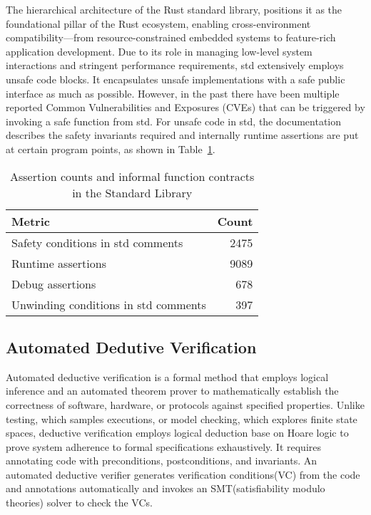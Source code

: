 \documentclass[conference]{IEEEtran}
\begin{document}
The hierarchical architecture of the Rust standard library, positions it as the foundational pillar of the Rust ecosystem, enabling cross-environment compatibility—from resource-constrained embedded systems to feature-rich application development. Due to its role in managing low-level system interactions and stringent performance requirements, std extensively employs unsafe code blocks. It encapsulates unsafe implementations with a safe public interface as much as possible. However, in the past there have been multiple reported Common Vulnerabilities and Exposures (CVEs)\cite{Qwaz_rust-cve} that can be triggered by invoking a safe function from std. For unsafe code in std, the documentation describes the safety invariants required and internally runtime assertions are put at certain program points, as shown in Table~\ref{tab:assertion_counts}.   

\begin{table}[htbp]
\centering
\begin{tabular}{l r}
\toprule
\textbf{Metric} & \textbf{Count} \\
\midrule
Safety conditions in std comments & 2475 \\
Runtime assertions & 9089 \\
Debug assertions & 678 \\
Unwinding conditions in std comments & 397 \\
\bottomrule
\end{tabular}
\caption{Assertion counts and informal function contracts in the Standard Library}
\label{tab:assertion_counts}
\end{table}

\subsection{Automated Dedutive Verification}
Automated deductive verification is a formal method that employs logical inference and an automated theorem prover to mathematically establish the correctness of software, hardware, or protocols against specified properties. Unlike testing, which samples executions, or model checking, which explores finite state spaces, deductive verification employs logical deduction base on Hoare logic to prove system adherence to formal specifications exhaustively. It requires annotating code with preconditions, postconditions, and invariants. An automated deductive verifier generates verification conditions(VC) from the code and annotations automatically and invokes an SMT(satisfiability modulo theories) solver to check the VCs.
\end{document}
